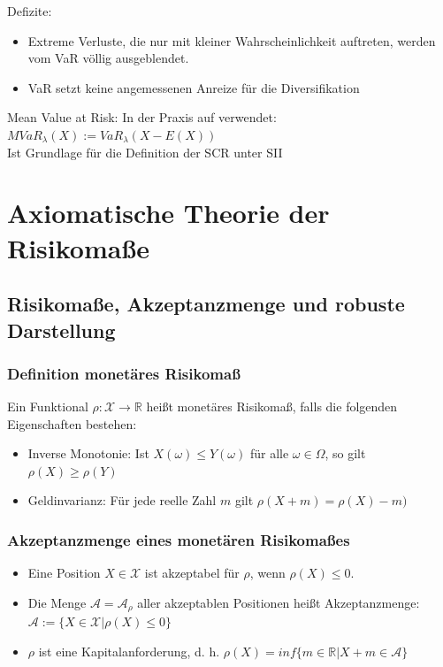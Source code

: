 \documentclass[12pt]{report}
\theoremstyle{dotless}
\theoremstyle{definition}
\begin{document}
Defizite:
\begin{itemize}
\item Extreme Verluste, die nur mit kleiner Wahrscheinlichkeit auftreten, werden vom
VaR völlig ausgeblendet.
\item VaR setzt keine angemessenen Anreize für die Diversifikation
\end{itemize}

Mean Value at Risk:
In der Praxis auf verwendet: $MVaR_\lambda(X) := VaR_\lambda(X-E(X))$ \\
Ist Grundlage für die Definition der SCR unter SII


\section{Axiomatische Theorie der Risikomaße}

\subsection{Risikomaße, Akzeptanzmenge und robuste Darstellung}

\subsubsection{Definition monetäres Risikomaß}
Ein Funktional $\rho: \mathcal{X} \rightarrow \mathbb{R}$ heißt monetäres Risikomaß, falls die folgenden Eigenschaften bestehen: 
\begin{itemize}
\item Inverse Monotonie: Ist $X(\omega) \leq Y(\omega)$ für alle $\omega \in \Omega$, so gilt $\rho(X) \geq \rho(Y)$
\item Geldinvarianz: Für jede reelle Zahl $m$ gilt $\rho(X+m)=\rho(X)-m)$
\end{itemize}

\subsubsection{Akzeptanzmenge eines monetären Risikomaßes}
\begin{itemize}
\item Eine Position $X \in \mathcal{X}$ ist akzeptabel für $\rho$, wenn $\rho(X)\leq 0$.
\item Die Menge $\mathcal{A}=\mathcal{A}_\rho$ aller akzeptablen Positionen heißt Akzeptanzmenge: $\mathcal{A} := \{X \in \mathcal{X}| \rho(X) \leq 0\}$
\item $\rho$ ist eine Kapitalanforderung, d. h. $\rho(X) = inf \{m \in \mathbb{R}|X+m\in \mathcal{A}\}$
\end{itemize}
\end{document}
